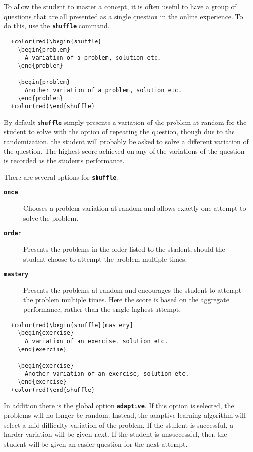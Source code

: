 \documentclass{amsart}
\newcommand\code[1]{{\bfseries\texttt{#1}}}
\begin{document}
To allow the student to master a concept, it is often useful to have a
group of questions that are all presented as a single question in the
online experience. To do this, use the \code{shuffle} command.


\begin{Verbatim}
  +color(red)\begin{shuffle}
    \begin{problem}
      A variation of a problem, solution etc.
    \end{problem}
    
    \begin{problem}
      Another variation of a problem, solution etc.
    \end{problem}
  +color(red)\end{shuffle}
\end{Verbatim}

By default \code{shuffle} simply presents a variation of the problem
at random for the student to solve with the option of repeating the
question, though due to the randomization, the student will probably
be asked to solve a different variation of the question. The highest
score achieved on any of the variations of the question is recorded as
the students performance.

There are several options for \code{shuffle}, 
\begin{description}
\item[\code{once}] Chooses a problem variation at random and allows
  exactly one attempt to solve the problem.
\item[\code{order}] Presents the problems in the order listed to the student, should the student choose to attempt the problem multiple times. 
\item[\code{mastery}] Presents the problems at random and encourages
  the student to attempt the problem multiple times. Here the score is
  based on the aggregate performance, rather than the single highest
  attempt.
\end{description}


\begin{Verbatim}
  +color(red)\begin{shuffle}[mastery]
    \begin{exercise}
      A variation of an exercise, solution etc.
    \end{exercise}
    
    \begin{exercise}
      Another variation of an exercise, solution etc.
    \end{exercise}
  +color(red)\end{shuffle}
\end{Verbatim}


In addition there is the global option \code{adaptive}. If this option
is selected, the problems will no longer be random. Instead, the
adaptive learning algorithm will select a mid difficulty variation of
the problem. If the student is successful, a harder variation will be
given next. If the student is unsuccessful, then the student will be given an easier question for the next attempt. 
\end{document}
